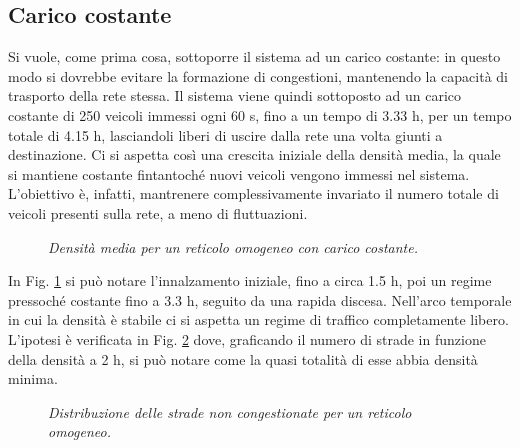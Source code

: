 \documentclass[../main.tex]{subfiles}
\begin{document}
\subsection{Carico costante}
Si vuole, come prima cosa, sottoporre il sistema ad un carico costante: in questo modo si dovrebbe evitare la formazione di congestioni, mantenendo la capacit\`a di trasporto della rete stessa.
Il sistema viene quindi sottoposto ad un carico costante di 250 veicoli immessi ogni 60 s, fino a un tempo di 3.33 h, per un tempo totale di 4.15 h, lasciandoli liberi di uscire dalla rete una volta giunti a destinazione.
Ci si aspetta cos\`i una crescita iniziale della densit\`a media, la quale si mantiene costante fintantoch\'e nuovi veicoli vengono immessi nel sistema.
L'obiettivo \`e, infatti, mantrenere complessivamente invariato il numero totale di veicoli presenti sulla rete, a meno di fluttuazioni.
\begin{figure}[H]
    \centering
    \caption[Densit\`a media per un reticolo omogeneo con carico costante]{\emph{Densit\`a media per un reticolo omogeneo con carico costante.}}
    \label{fig:density_constant_homo}
\end{figure}
In Fig. \ref{fig:density_constant_homo} si pu\`o notare l'innalzamento iniziale, fino a circa 1.5 h, poi un regime pressoch\'e costante fino a 3.3 h, seguito da una rapida discesa.
Nell'arco temporale in cui la densit\`a \`e stabile ci si aspetta un regime di traffico completamente libero.
L'ipotesi \`e verificata in Fig. \ref{fig:nStreet_density_constant_homo} dove, graficando il numero di strade in funzione della densit\`a a 2 h, si pu\`o notare come la quasi totalit\`a di esse abbia densit\`a minima.
\begin{figure}[H]
    \centering
    \caption[Distribuzione delle strade non congestionate per un reticolo omogeneo.]{\emph{Distribuzione delle strade non congestionate per un reticolo omogeneo.}}
    \label{fig:nStreet_density_constant_homo}
\end{figure}
\end{document}
